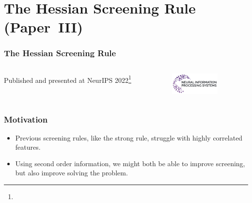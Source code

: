 \documentclass[10pt]{beamer}
\begin{document}
\section{The Hessian Screening Rule (Paper~III)}

\begin{frame}[c]
  \frametitle{The Hessian Screening Rule}

  \begin{columns}
    \begin{column}{0.45\textwidth}

      Published and presented at NeurIPS 2022\footnote[frame]{}
    \end{column}
    \begin{column}{0.45\textwidth}
      \includegraphics[width=\textwidth]{figures/neurips.pdf}
    \end{column}
  \end{columns}
\end{frame}

\begin{frame}[c]
  \frametitle{Motivation}

  \begin{itemize}
    \item Previous screening rules, like the strong rule, struggle with highly correlated features.
    \item Using second order information, we might both be able to improve screening, but also
          improve solving the problem.
  \end{itemize}
\end{frame}
\end{document}
